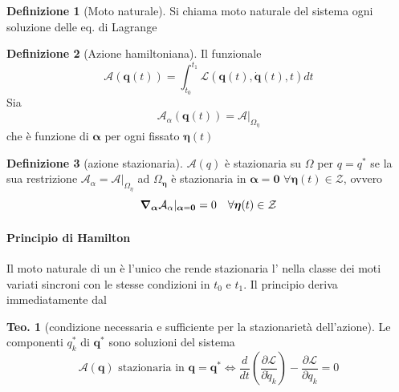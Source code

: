 \documentclass[a4paper,10pt]{article}
\theoremstyle{definition}
\newcommand{\bv}{\boldsymbol} %
\theoremstyle{indentdefinition}
\newtheorem{defn}{Definizione}[section]
\theoremstyle{indenttheorem}
\newtheorem{thm}{Teo.}
\theoremstyle{myremark}
\theoremstyle{indentgeneral}
\newenvironment{myboxed} 
{\noindent\begin{lrbox}{\mybox}\begin{minipage}{\textwidth}}
{\end{minipage}\end{lrbox}\fbox{\usebox{\mybox}}}
\begin{document}
\begin{defn}[Moto naturale]
 Si chiama moto naturale del sistema ogni soluzione delle eq. di Lagrange  
\end{defn}

\begin{defn}[Azione hamiltoniana]
\label{def:azione-hamiltoniana}Il funzionale $$\mathcal{A}\left(\bv{q}(t)\right)=\int_{t_{0}}^{t_{1}}\mathcal{L}\left(\bv{q}\left(t\right),\dot{\bv{q}}\left(t\right),t\right)dt$$
Sia  
$$\mathcal{A}_{\alpha}(\bv{q}(t))=\mathcal{A}\vert_{\Omega_{\eta}}$$
che è funzione di $\bv{\alpha}$ per ogni fissato $\bv{\eta}(t)$
\end{defn}

\begin{defn}[azione stazionaria]
\label{def:azione-stazionaria}$\mathcal{A}\left(q\right)$ è stazionaria
su $\Omega$ per $q=q^{*}$ se la sua restrizione  $\mathcal{A}_{\alpha}=\mathcal{A}\vert_{\Omega_{\eta}}$ ad $\Omega_{\bv{\eta}}$
è stazionaria in $\bv{\alpha}=\bv{0}$ $\forall\bv{\eta}(t)\in\mathcal{Z}$, ovvero
\[
\grad_{\bv{\alpha}}\mathcal{A}_{\alpha}\vert_{\bv{\alpha}=\bv{0}}=0\quad\forall\bv{\eta}(t)\in\mathcal{Z}
\]
\end{defn}


\paragraph{Principio di Hamilton}

Il moto naturale di un 
è l'unico che rende stazionaria l'
nella classe dei moti variati sincroni con le stesse condizioni in
$t_{0}$ e $t_{1}$. Il principio deriva immediatamente dal

\begin{myboxed}
\begin{thm}[condizione necessaria e sufficiente per la stazionarietà dell'azione]
Le componenti $q_{k}^{*}$ di $\bv{q}^{*}$ sono soluzioni del sistema
\[
\mathcal{A}(\bv{q})\text{ stazionaria in }\bv{q}=\bv{q}^*\iff\frac{d}{dt}\left(\frac{\partial\mathcal{L}}{\partial\dot{q}_{k}}\right)-\frac{\partial\mathcal{L}}{\partial q_{k}}=0
\]
\end{thm}
\end{myboxed}
\end{document}
